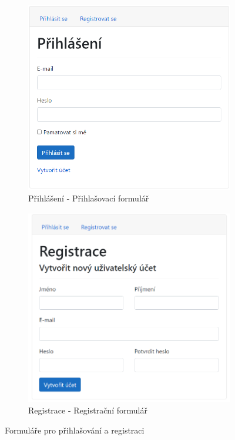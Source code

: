 \documentclass[a4paper, 12pt]{report}
\begin{document}
	\begin{figure}[H]
     \centering
     \begin{subfigure}[H]{0.45\textwidth}
         \centering
         \includegraphics[width=\textwidth]{PrihlasovaciFormular}
         \caption{Přihlášení - Přihlašovací formulář}
         \label{PrihlasovaciFormular}
     \end{subfigure}
	 \hfill
     \begin{subfigure}[H]{0.45\textwidth}
         \centering
         \includegraphics[width=\textwidth]{RegistracniFormular}
         \caption{Registrace - Registrační formulář}
         \label{RegistracniFormular}
     \end{subfigure}
        \caption{Formuláře pro přihlašování a registraci}
        \label{PrihlasovaniRegistrace}
\end{figure}
\end{document}
